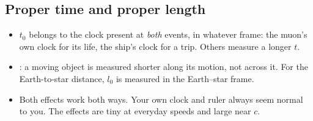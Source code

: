 \subsection{Proper time and proper length}
\begin{itemize}
  \item $t_0$ belongs to the clock present at \emph{both} events, in whatever frame: the muon's
        own clock for its life, the ship's clock for a trip. Others measure a longer $t$.
  \item {}: a moving object is measured shorter along its motion, not
        across it.
        For the Earth-to-star distance, $l_0$ is measured in the Earth--star frame.
  \item Both effects work both ways. Your own clock and ruler always seem normal to you. The
        effects are tiny at everyday speeds and large near $c$.
\end{itemize}

